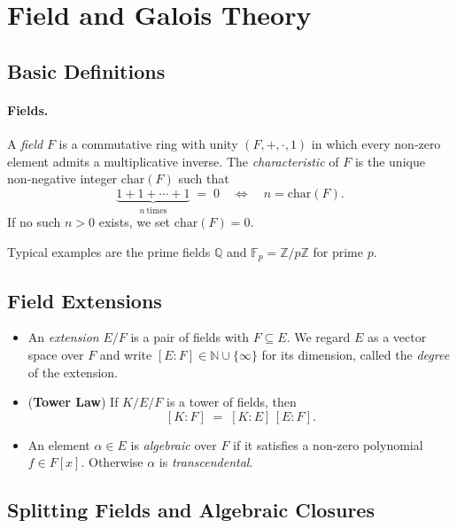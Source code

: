 \section{Field and Galois Theory}

\subsection{Basic Definitions}

\paragraph{Fields.}
A \emph{field} \(F\) is a commutative ring with unity \((F,+,\cdot,1)\) in which every non‑zero element admits a multiplicative inverse.  
The \emph{characteristic} of \(F\) is the unique non‑negative integer \(\mathrm{char}(F)\) such that
\[
\underbrace{1 + 1 + \cdots + 1}_{n\ \text{times}} \;=\; 0 
\quad\Longleftrightarrow\quad n = \mathrm{char}(F).
\]
If no such \(n>0\) exists, we set \(\mathrm{char}(F)=0\).

\vspace{0.5em}
\noindent
Typical examples are the prime fields \(\mathbb{Q}\) and \(\mathbb{F}_p = \mathbb{Z}/p\mathbb{Z}\) for prime \(p\).

\subsection{Field Extensions}

\begin{itemize}
    \item An \emph{extension} \(E/F\) is a pair of fields with \(F\subseteq E\).  
          We regard \(E\) as a vector space over \(F\) and write \([E:F]\in\mathbb{N}\cup\{\infty\}\) for its dimension, called the \emph{degree} of the extension.
    \item (\textbf{Tower Law}) If \(K/E/F\) is a tower of fields, then
          \[
          [K:F] \;=\; [K:E]\,[E:F].
          \]
    \item An element \(\alpha\in E\) is \emph{algebraic} over \(F\) if it satisfies a non‑zero polynomial \(f\in F[x]\).  
          Otherwise \(\alpha\) is \emph{transcendental}.
\end{itemize}

\subsection{Splitting Fields and Algebraic Closures}

